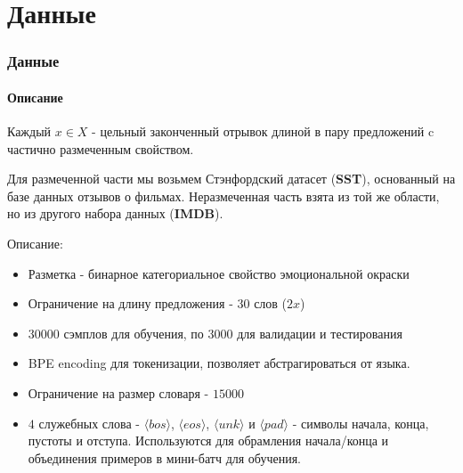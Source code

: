 \documentclass[10pt]{beamer}
\begin{document}
\section{Данные}
\begin{frame}
\frametitle{Данные}
\framesubtitle{Описание}


Каждый $x \in X$ - цельный законченный отрывок длиной в пару предложений c частично размеченным свойством. 

Для размеченной части мы возьмем Стэнфордский датасет (\textbf{SST}), основанный на базе данных отзывов о фильмах. Неразмеченная часть взята из той же области, но из другого набора данных (\textbf{IMDB}).

\vskip3mm

\newcommand{\bos}{\langle bos \rangle}
\newcommand{\eos}{\langle eos \rangle}
\newcommand{\unk}{\langle unk \rangle}
\newcommand{\pad}{\langle pad \rangle}

Описание:
\begin{itemize}
    \item Разметка - бинарное категориальное свойство эмоциональной окраски
    \item Ограничение на длину предложения - $30$ слов ($2x$)
    \item $30000$ сэмплов для обучения, по $3000$ для валидации и тестирования
    \item BPE encoding для токенизации, позволяет абстрагироваться от языка.
    \item Ограничение на размер словаря - $15000$
    \item $4$ служебных слова - $\bos$, $\eos$, $\unk$ и $\pad$ - символы начала, конца, пустоты и отступа. Используются для обрамления начала/конца и объединения примеров в мини-батч для обучения.
\end{itemize}

\end{frame}
\end{document}
